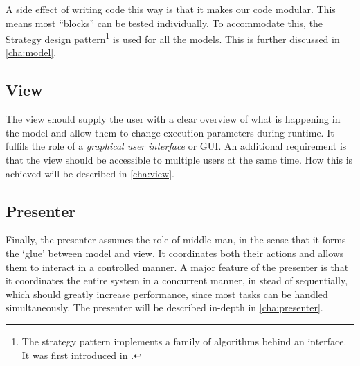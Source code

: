 \documentclass[a4paper, openany, oneside]{memoir}
\begin{document}
A side effect of writing code this way is that it makes our code modular. This means most ``blocks'' can be tested individually. To accommodate this, the Strategy design pattern\footnote{The strategy pattern implements a family of algorithms behind an interface. It was first introduced in \cite{designpatterns}. } is used for all the models. This is further discussed in \cref{cha:model}.

\subsection{View}
\label{sub:view}
The view should supply the user with a clear overview of what is happening in the model and allow them to change execution parameters during runtime. It fulfils the role of a \emph{graphical user interface} or GUI. An additional requirement is that the view should be accessible to multiple users at the same time. How this is achieved will be described in \cref{cha:view}.

\subsection{Presenter}
\label{sub:presenter}
Finally, the presenter assumes the role of middle-man, in the sense that it forms the `glue' between model and view. It coordinates both their actions and allows them to interact in a controlled manner. A major feature of the presenter is that it coordinates the entire system in a concurrent manner, in stead of sequentially, which should greatly increase performance, since most tasks can be handled simultaneously. The presenter will be described in-depth in \cref{cha:presenter}.
\end{document}
